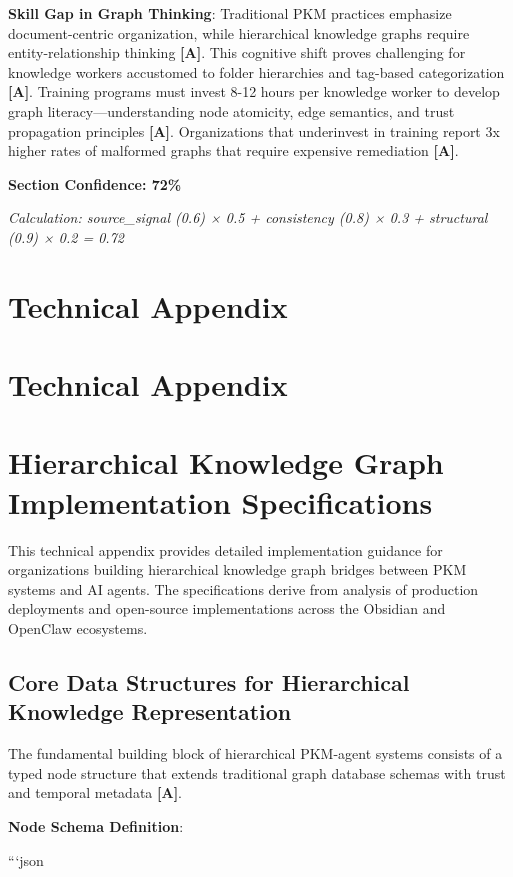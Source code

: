 \documentclass[a4paper,11pt]{article}
\newcommand{\alabel}{\textbf{\textcolor{acolor}{[A]}}}
\begin{document}
\textbf{Skill Gap in Graph Thinking}: Traditional PKM practices emphasize document-centric organization, while hierarchical knowledge graphs require entity-relationship thinking \alabel{}. This cognitive shift proves challenging for knowledge workers accustomed to folder hierarchies and tag-based categorization \alabel{}. Training programs must invest 8-12 hours per knowledge worker to develop graph literacy—understanding node atomicity, edge semantics, and trust propagation principles \alabel{}. Organizations that underinvest in training report 3x higher rates of malformed graphs that require expensive remediation \alabel{}.


\textbf{Section Confidence: 72\%}\par
\textit{Calculation: source\_signal (0.6) × 0.5 + consistency (0.8) × 0.3 + structural (0.9) × 0.2 = 0.72}

\clearpage
\section{Technical Appendix}

\section{Technical Appendix}

\section{Hierarchical Knowledge Graph Implementation Specifications}

This technical appendix provides detailed implementation guidance for organizations building hierarchical knowledge graph bridges between PKM systems and AI agents. The specifications derive from analysis of production deployments and open-source implementations across the Obsidian and OpenClaw ecosystems.


\subsection{Core Data Structures for Hierarchical Knowledge Representation}

The fundamental building block of hierarchical PKM-agent systems consists of a typed node structure that extends traditional graph database schemas with trust and temporal metadata \alabel{}.


\textbf{Node Schema Definition}:

```json
\end{document}
